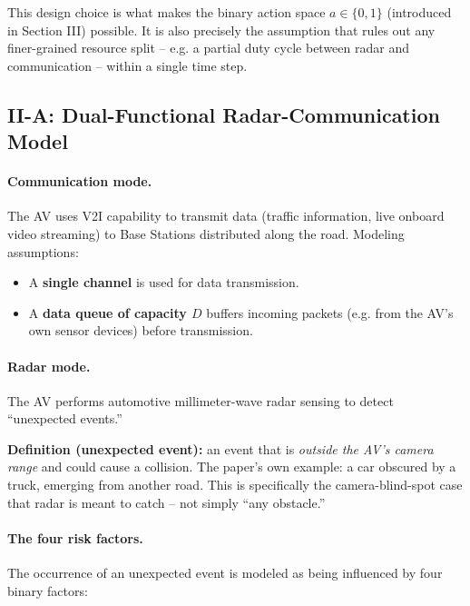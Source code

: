 \documentclass[11pt]{article}
\begin{document}
\begin{remark}
This design choice is what makes the binary action space $a \in \{0,1\}$ (introduced in
Section III) possible. It is also precisely the assumption that rules out any
finer-grained resource split -- e.g. a partial duty cycle between radar and
communication -- within a single time step.
\end{remark}

\subsection{II-A: Dual-Functional Radar-Communication Model}

\paragraph{Communication mode.} The AV uses V2I capability to transmit data (traffic
information, live onboard video streaming) to Base Stations distributed along the road.
Modeling assumptions:
\begin{itemize}[leftmargin=1.5em]
    \item A \textbf{single channel} is used for data transmission.
    \item A \textbf{data queue of capacity $D$} buffers incoming packets (e.g. from the
    AV's own sensor devices) before transmission.
\end{itemize}

\paragraph{Radar mode.} The AV performs automotive millimeter-wave radar sensing to
detect ``unexpected events.''

\begin{definitionbox}
\textbf{Definition (unexpected event):} an event that is \emph{outside the AV's
camera range} and could cause a collision. The paper's own example: a car obscured by a
truck, emerging from another road. This is specifically the camera-blind-spot case that
radar is meant to catch -- not simply ``any obstacle.''
\end{definitionbox}

\paragraph{The four risk factors.} The occurrence of an unexpected event is modeled as
being influenced by four binary factors:
\end{document}
